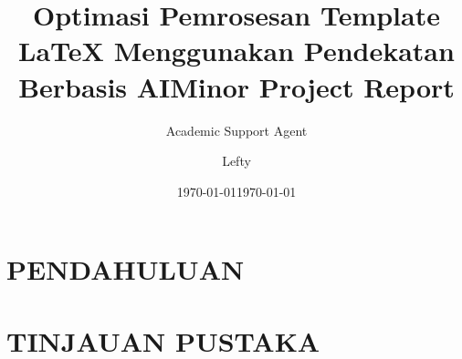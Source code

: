 \documentclass{article}
\title{Optimasi Pemrosesan Template LaTeX Menggunakan Pendekatan Berbasis AI}
\author{Academic Support Agent}
\date{\today}
\begin{document}
\maketitle

\begin{abstract}

\end{abstract}

\chapter{PENDAHULUAN}


\chapter{TINJAUAN PUSTAKA}


\usepackage{report}

\usepackage[acronym]{glossaries}
\usepackage{rotating}
\usepackage{float}
\usepackage{siunitx}
\usepackage{array}
\usepackage[justification=centering]{caption}
\captionsetup[figure]{font=small}
\usepackage{booktabs}
\usepackage[table,xcdraw]{xcolor}
\usepackage{chngcntr}
\usepackage[utf8]{inputenc}
\usepackage{listings}
\usepackage{subcaption}
\usepackage{tocloft}
\usepackage{indentfirst}
\usepackage{enumitem}
\usepackage{booktabs}
\usepackage{multirow}
\usepackage{flafter}

\setcounter{secnumdepth}{3} %
\setlength{\cfttabindent}{0pt} %
\setlength{\cftfigindent}{0pt} %


\title{Minor Project Report}
\author{Lefty}
\date{\today}
\end{document}
